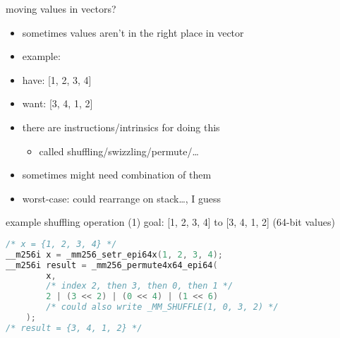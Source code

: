 \begin{frame}{moving values in vectors?}
\begin{itemize}
\item sometimes values aren't in the right place in vector
\item example:
\item have: [1, 2, 3, 4]
\item want: [3, 4, 1, 2]
\vspace{.5cm}
\item there are instructions/intrinsics for doing this
    \begin{itemize}
    \item called shuffling/swizzling/permute/\ldots
    \end{itemize}
\item sometimes might need combination of them
\item worst-case: could rearrange on stack\ldots, I guess
\end{itemize}
\end{frame}

\begin{frame}[fragile,label=exampleShuffle]{example shuffling operation (1)}
goal: [1, 2, 3, 4] to [3, 4, 1, 2] (64-bit values)
\begin{lstlisting}[language=C++,style=smaller]
/* x = {1, 2, 3, 4} */
__m256i x = _mm256_setr_epi64x(1, 2, 3, 4);
__m256i result = _mm256_permute4x64_epi64(
        x,
        /* index 2, then 3, then 0, then 1 */
        2 | (3 << 2) | (0 << 4) | (1 << 6)
        /* could also write _MM_SHUFFLE(1, 0, 3, 2) */
    );
/* result = {3, 4, 1, 2} */
\end{lstlisting}
\end{frame}
